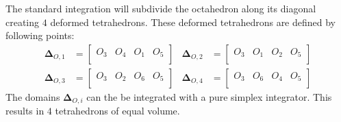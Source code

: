 \documentclass{mitschrift}
\newcommand{\simplex}{\boldsymbol{\Delta}}
\begin{document}
The standard integration will subdivide the octahedron along its diagonal creating $4$ deformed tetrahedrons.
These deformed tetrahedrons are defined by following points: \begin{align}
    \simplex_{O,1} &= \begin{bmatrix}
        O_3 & O_4 & O_1 & O_5 \\
    \end{bmatrix} & \simplex_{O,2} &= \begin{bmatrix}
        O_3 & O_1 & O_2 & O_5 \\
    \end{bmatrix} \\
    \simplex_{O,3} &= \begin{bmatrix}
        O_3 & O_2 & O_6 & O_5 \\
    \end{bmatrix} & \simplex_{O,4} &= \begin{bmatrix}
        O_3 & O_6 & O_4 & O_5 \\
    \end{bmatrix}
\end{align}
The domains $\simplex_{O,i}$ can the be integrated with a pure simplex integrator. This results in $4$ tetrahedrons of equal volume.
\end{document}
